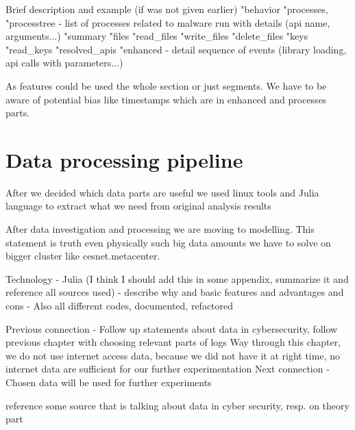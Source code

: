 Brief description and example (if was not given earlier)
"behavior
    "processes, "processtree  - list of processes related to malware run with details (api name, arguments...)
    "summary
        "files
        "read_files
        "write_files
        "delete_files
        "keys
        "read_keys
        "resolved_apis    
    "enhanced - detail sequence of events (library loading, api calls with parameters...)

As features could be used the whole section or just segments. We have to be aware of potential bias like timestamps which are in enhanced and processes parts.

\section{Data processing pipeline}
After we decided which data parts are useful we used linux tools and Julia language to  extract what we need from original analysis results 

After data investigation and processing we are moving to modelling. This statement is truth even physically such big data amounts we have to solve on bigger cluster like cesnet.metacenter. 


Technology - Julia (I think I should add this in some appendix, summarize it and reference all sources used)
  - describe why and basic features and advantages and cons
  - Also all different codes, documented, refactored



Previous connection
- Follow up statements about data in cybersecurity, follow previous chapter with choosing relevant parts of logs
Way through this chapter, we do not use internet access data, because we did not have it at right time, no internet data are sufficient for our further experimentation
Next connection
- Chosen data will be used for further experiments


reference some source that is talking about data in cyber security, resp. on theory part



